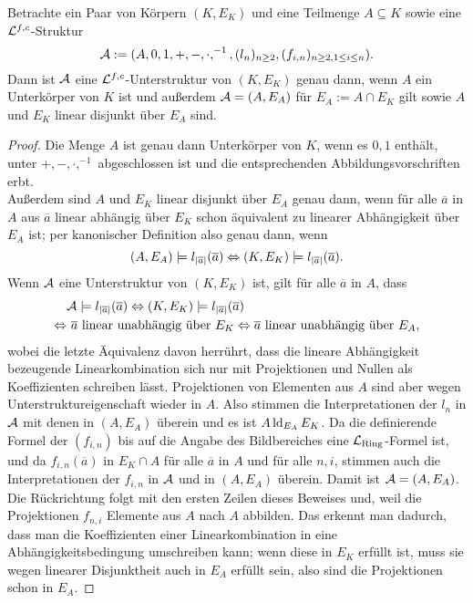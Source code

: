     \begin{lemma}
    	Betrachte ein Paar von Körpern $(K,E_K)$ und eine Teilmenge ${A\subseteq K}$ sowie eine $\mathcal{L}^{f,c}$-Struktur $$\mathcal{A}:=(A,0,1,+,-,\cdot,^{-1},(l_n)_{n\geq2},(f_{i,n})_{n\geq2,1\leq i\leq n}).$$ Dann ist $\mathcal{A}$ eine $\mathcal{L}^{f,c}$-Unterstruktur von $(K,E_K)$ genau dann, wenn $A$ ein Unterkörper von $K$ ist und außerdem $\mathcal{A}=(A,E_A)$ für $E_A:=A\cap E_K$ gilt sowie $A$ und $E_K$ linear disjunkt über $E_A$ sind.
    \end{lemma}
    \begin{proof}
    	Die Menge $A$ ist genau dann Unterkörper von $K$, wenn es $0,1$ enthält, unter $+,-,\cdot,^{-1}$ abgeschlossen ist und die entsprechenden Abbildungsvorschriften erbt.\\
    	Außerdem sind $A$ und $E_K$ linear disjunkt über $E_A$ genau dann, wenn für alle $\overline{a}$ in $A$ aus $\overline{a}$ linear abhängig über $E_K$ schon äquivalent zu linearer Abhängigkeit über $E_A$ ist; per kanonischer Definition also genau dann, wenn $$(A,E_A)\models l_{{\left| \overline{a} \right|}}(\overline{a}) \Leftrightarrow (K,E_K)\models l_{{\left| \overline{a} \right|}}(\overline{a}).$$
    	Wenn $\mathcal{A}$ eine Unterstruktur von $(K,E_K)$ ist, gilt für alle $\overline{a}$ in $A$, dass
    	\begin{align*}
    	&\mathcal{A}\models l_{{\left| \overline{a} \right|}}(\overline{a})\Leftrightarrow(K,E_K)\models l_{{\left| \overline{a} \right|}}(\overline{a})\\
    	\Leftrightarrow&\ \overline{a}\text{ linear unabhängig über }E_K\Leftrightarrow\overline{a}\text{ linear unabhängig über }E_A,
    	\end{align*}
    	wobei die letzte Äquivalenz davon herrührt, dass die lineare Abhängigkeit bezeugende Linearkombination sich nur mit Projektionen und Nullen als Koeffizienten schreiben lässt. Projektionen von Elementen aus $A$ sind aber wegen Unterstruktureigenschaft wieder in $A$.\newpage
    	Also stimmen die Interpretationen der $l_n$ in $\mathcal{A}$ mit denen in $(A,E_A)$ überein und es ist $A\operatorname{ld}_{E_A}E_K$. Da die definierende Formel der $(f_{i,n})$ bis auf die Angabe des Bildbereiches eine $\mathcal{L}_{\text{Ring}}$-Formel ist, und da $f_{i,n}(\overline{a})$ in $E_K\cap A$ für alle $\overline{a}$ in $A$ und für alle $n,i$, stimmen auch die Interpretationen der $f_{i,n}$ in $\mathcal{A}$ und in $(A,E_A)$ überein. Damit ist $\mathcal{A}=(A,E_A)$.\\
    	Die Rückrichtung folgt mit den ersten Zeilen dieses Beweises und, weil die Projektionen $f_{n,i}$ Elemente aus $A$ nach $A$ abbilden. Das erkennt man dadurch, dass man die Koeffizienten einer Linearkombination in eine Abhängigkeitsbedingung umschreiben kann; wenn diese in $E_K$ erfüllt ist, muss sie wegen linearer Disjunktheit auch in $E_A$ erfüllt sein, also sind die Projektionen schon in $E_A$.
    \end{proof}
    
